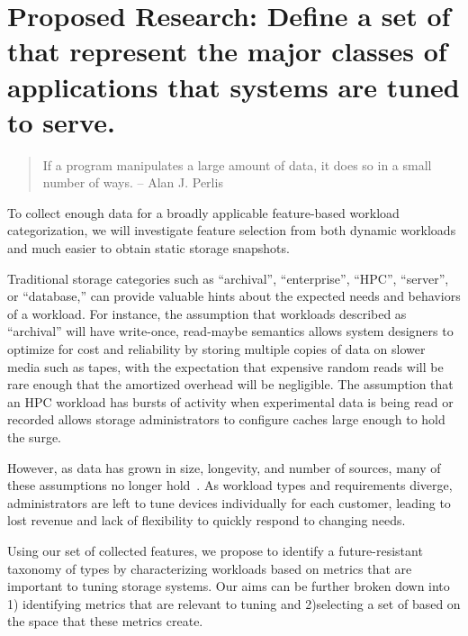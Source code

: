 \section{Proposed Research: Define a set of \mWs that represent the major classes of applications that systems are tuned to serve.}
\begin{quote}
If a program manipulates a large amount of data, it does so in a small number of
ways.
-- Alan J. Perlis
\end{quote}


To collect enough data for a broadly applicable feature-based workload
categorization, we will investigate feature selection from both dynamic
workloads and much easier to obtain static storage snapshots.

Traditional storage categories such as 
``archival'', ``enterprise'', ``HPC'', ``server'', or ``database,'' can provide
valuable hints about the expected needs and behaviors of a workload.  For
instance, the assumption that workloads described as ``archival'' will have
write-once, read-maybe semantics allows system designers to optimize for cost
and reliability by storing multiple copies of data on slower media such as
tapes, with the expectation that expensive random reads will be rare enough that
the amortized overhead will be negligible.  The assumption that an HPC workload
has bursts of activity when experimental data is being read or recorded allows
storage administrators to configure caches large enough to hold the surge.

However, as data has grown in size, longevity, and number of sources, many of
these assumptions no longer hold~\cite{ian-tos,dwyer2012practical}.  As workload types and
requirements diverge, administrators are left to tune devices individually for
each customer, leading to lost revenue and lack of flexibility to quickly
respond to changing needs.  

Using our set of collected features, we propose to identify a future-resistant taxonomy
of \mW types by characterizing workloads based on metrics that are
important to tuning storage systems.  Our aims can be further broken down
into 1) identifying metrics that are relevant to tuning and 2)selecting a set of
\mws based on the space that these metrics create. 

